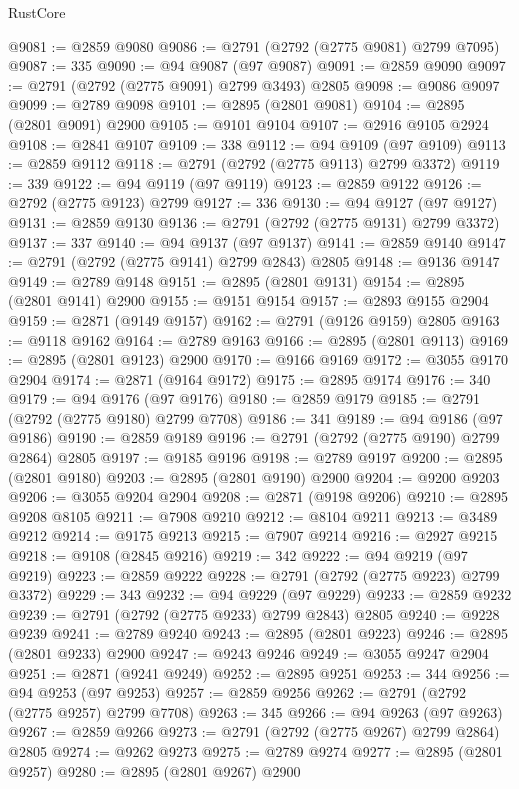 \begin{lexlean}{RustCore}
\begin{coremodule}
@9081 := @2859 @9080
@9086 := @2791 (@2792 (@2775 @9081) @2799 @7095)
@9087 := 335
@9090 := @94 @9087 (@97 @9087)
@9091 := @2859 @9090
@9097 := @2791 (@2792 (@2775 @9091) @2799 @3493) @2805
@9098 := @9086 @9097
@9099 := @2789 @9098
@9101 := @2895 (@2801 @9081)
@9104 := @2895 (@2801 @9091) @2900
@9105 := @9101 @9104
@9107 := @2916 @9105 @2924
@9108 := @2841 @9107
@9109 := 338
@9112 := @94 @9109 (@97 @9109)
@9113 := @2859 @9112
@9118 := @2791 (@2792 (@2775 @9113) @2799 @3372)
@9119 := 339
@9122 := @94 @9119 (@97 @9119)
@9123 := @2859 @9122
@9126 := @2792 (@2775 @9123) @2799
@9127 := 336
@9130 := @94 @9127 (@97 @9127)
@9131 := @2859 @9130
@9136 := @2791 (@2792 (@2775 @9131) @2799 @3372)
@9137 := 337
@9140 := @94 @9137 (@97 @9137)
@9141 := @2859 @9140
@9147 := @2791 (@2792 (@2775 @9141) @2799 @2843) @2805
@9148 := @9136 @9147
@9149 := @2789 @9148
@9151 := @2895 (@2801 @9131)
@9154 := @2895 (@2801 @9141) @2900
@9155 := @9151 @9154
@9157 := @2893 @9155 @2904
@9159 := @2871 (@9149 @9157)
@9162 := @2791 (@9126 @9159) @2805
@9163 := @9118 @9162
@9164 := @2789 @9163
@9166 := @2895 (@2801 @9113)
@9169 := @2895 (@2801 @9123) @2900
@9170 := @9166 @9169
@9172 := @3055 @9170 @2904
@9174 := @2871 (@9164 @9172)
@9175 := @2895 @9174
@9176 := 340
@9179 := @94 @9176 (@97 @9176)
@9180 := @2859 @9179
@9185 := @2791 (@2792 (@2775 @9180) @2799 @7708)
@9186 := 341
@9189 := @94 @9186 (@97 @9186)
@9190 := @2859 @9189
@9196 := @2791 (@2792 (@2775 @9190) @2799 @2864) @2805
@9197 := @9185 @9196
@9198 := @2789 @9197
@9200 := @2895 (@2801 @9180)
@9203 := @2895 (@2801 @9190) @2900
@9204 := @9200 @9203
@9206 := @3055 @9204 @2904
@9208 := @2871 (@9198 @9206)
@9210 := @2895 @9208 @8105
@9211 := @7908 @9210
@9212 := @8104 @9211
@9213 := @3489 @9212
@9214 := @9175 @9213
@9215 := @7907 @9214
@9216 := @2927 @9215
@9218 := @9108 (@2845 @9216)
@9219 := 342
@9222 := @94 @9219 (@97 @9219)
@9223 := @2859 @9222
@9228 := @2791 (@2792 (@2775 @9223) @2799 @3372)
@9229 := 343
@9232 := @94 @9229 (@97 @9229)
@9233 := @2859 @9232
@9239 := @2791 (@2792 (@2775 @9233) @2799 @2843) @2805
@9240 := @9228 @9239
@9241 := @2789 @9240
@9243 := @2895 (@2801 @9223)
@9246 := @2895 (@2801 @9233) @2900
@9247 := @9243 @9246
@9249 := @3055 @9247 @2904
@9251 := @2871 (@9241 @9249)
@9252 := @2895 @9251
@9253 := 344
@9256 := @94 @9253 (@97 @9253)
@9257 := @2859 @9256
@9262 := @2791 (@2792 (@2775 @9257) @2799 @7708)
@9263 := 345
@9266 := @94 @9263 (@97 @9263)
@9267 := @2859 @9266
@9273 := @2791 (@2792 (@2775 @9267) @2799 @2864) @2805
@9274 := @9262 @9273
@9275 := @2789 @9274
@9277 := @2895 (@2801 @9257)
@9280 := @2895 (@2801 @9267) @2900

\end{coremodule}
\end{lexlean}
